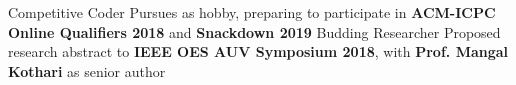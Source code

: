 
\begin{cvmiscs}

  \cvmisc
    {Competitive Coder}
    {Pursues as hobby, preparing to participate in \textbf{ACM-ICPC Online Qualifiers 2018} and \textbf{Snackdown 2019}}
  \cvmisc
    {Budding Researcher}
    {Proposed research abstract to \textbf{IEEE OES AUV Symposium 2018}, with \textbf{Prof. Mangal Kothari} as senior author}
  
\end{cvmiscs}